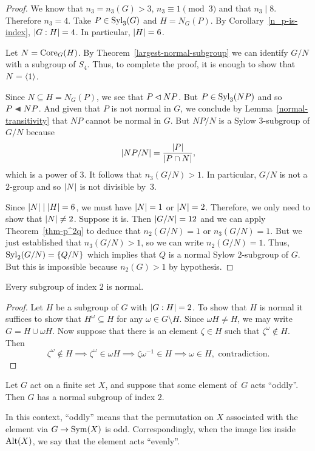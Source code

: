 \begin{proof} We know that $n_3=n_3(G)>3$, $n_3\equiv1\pmod3$ and that $n_3\mid 8$. Therefore $n_3=4$. Take $P\in{\rm Syl}_3(G)$ and $H=N_G(P)$. By Corollary~\ref{n_p-is-index}, $\left\vert{G:H}\right\vert=4$. In particular, $\left\vert{H}\right\vert=6$.

Let $N={\rm Core}_G(H)$. By Theorem~\ref{largest-normal-subgroup} we can identify $G/N$ with a subgroup of $S_4$. Thus, to complete the proof, it is enough to show that $N=\langle1\rangle$.

Since $N\subseteq H=N_G(P)$, we see that $P\lhd NP$. But $P\in{\rm Syl}_3(NP)$ and so $P\ch NP$. And given that $P$ is not normal in $G$, we conclude by Lemma~\ref{normal-transitivity} that $NP$ cannot be normal in $G$. But $NP/N$ is a Sylow $3$-subgroup of $G/N$ because
$$
    \left\vert{NP/N}\right\vert = \frac{\left\vert{P}\right\vert}{\left\vert{P\cap N}\right\vert},
$$
which is a power of $3$. It follows that $n_3(G/N)>1$. In particular, $G/N$ is not a $2$-group and so $\left\vert{N}\right\vert$ is not divisible by~$3$.

Since $\left\vert{N}\right\vert\mid\left\vert{H}\right\vert=6$, we must have $\left\vert{N}\right\vert=1$ or $\left\vert{N}\right\vert=2$. Therefore, we only need to show that $\left\vert{N}\right\vert\ne2$. Suppose it is. Then $\left\vert{G/N}\right\vert=12$ and we can apply Theorem~\ref{thm-p^2q} to deduce that $n_2(G/N)=1$ or $n_3(G/N)=1$. But we just established that $n_3(G/N)>1$, so we can write $n_2(G/N)=1$. Thus, ${\rm Syl}_2(G/N)=\{Q/N\}$ which implies that $Q$ is a normal Sylow $2$-subgroup of $G$. But this is impossible because $n_2(G)>1$ by hypothesis.  \end{proof}

\begin{lem}\label{index-2-is-normal}
    Every subgroup of index $2$ is normal.
\end{lem}

\begin{proof} {} Let $H$ be a subgroup of $G$ with $\left\vert{G:H}\right\vert=2$. To show that $H$ is normal it suffices to show that $H^\omega\subseteq H$ for any $\omega\in G\setminus H$. Since $\omega H\ne H$, we may write $G=H\cup\omega H$. Now suppose that there is an element $\zeta\in H$ such that $\zeta^\omega\notin H$. Then
$$
    \zeta^\omega\notin H\implies\zeta^\omega\in\omega H
        \implies\zeta\omega^{-1}\in H\implies \omega\in H,\text{ contradiction.}
$$
 \end{proof}

\begin{lem}
    Let\/ $G$ act on a finite set $X$, and suppose that some element of\/~$G$ acts ``oddly''. Then $G$ has a normal subgroup of index $2$.

    \textrm{ In this context, ``oddly'' means that the permutation on $X$ associated with the element via $G\to{\rm Sym}(X)$ is odd. Correspondingly, when the image lies inside ${\rm Alt}(X)$, we say that the element acts ``evenly''.}
\end{lem}

